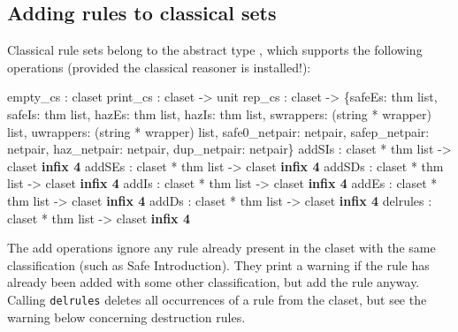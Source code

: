 \subsection{Adding rules to classical sets}
Classical rule sets belong to the abstract type , which
supports the following operations (provided the classical reasoner is
installed!):
\begin{ttbox} 
empty_cs : claset
print_cs : claset -> unit
rep_cs : claset -> \{safeEs: thm list, safeIs: thm list,
                    hazEs: thm list,  hazIs: thm list, 
                    swrappers: (string * wrapper) list, 
                    uwrappers: (string * wrapper) list,
                    safe0_netpair: netpair, safep_netpair: netpair,
                    haz_netpair: netpair, dup_netpair: netpair\}
addSIs   : claset * thm list -> claset                 \hfill{\bf infix 4}
addSEs   : claset * thm list -> claset                 \hfill{\bf infix 4}
addSDs   : claset * thm list -> claset                 \hfill{\bf infix 4}
addIs    : claset * thm list -> claset                 \hfill{\bf infix 4}
addEs    : claset * thm list -> claset                 \hfill{\bf infix 4}
addDs    : claset * thm list -> claset                 \hfill{\bf infix 4}
delrules : claset * thm list -> claset                 \hfill{\bf infix 4}
\end{ttbox}
The add operations ignore any rule already present in the claset with the same
classification (such as Safe Introduction).  They print a warning if the rule
has already been added with some other classification, but add the rule
anyway.  Calling \texttt{delrules} deletes all occurrences of a rule from the
claset, but see the warning below concerning destruction rules.

